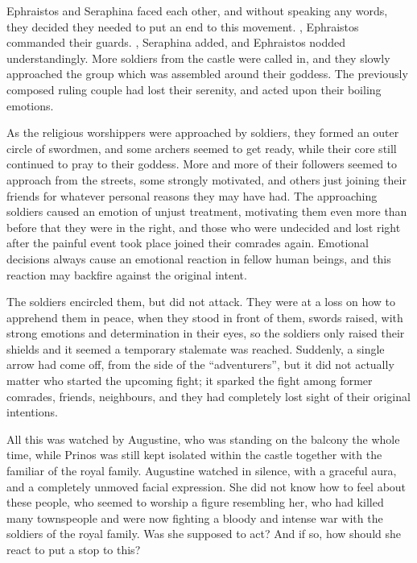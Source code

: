 Ephraistos and Seraphina faced each other, and without speaking any words, they decided they needed to put an end to this movement. , Ephraistos commanded their guards. , Seraphina added, and Ephraistos nodded understandingly. More soldiers from the castle were called in, and they slowly approached the group which was assembled around their goddess. The previously composed ruling couple had lost their serenity, and acted upon their boiling emotions.

As the religious worshippers were approached by soldiers, they formed an outer circle of swordmen, and some archers seemed to get ready, while their core still continued to pray to their goddess. More and more of their followers seemed to approach from the streets, some strongly motivated, and others just joining their friends for whatever personal reasons they may have had. The approaching soldiers caused an emotion of unjust treatment, motivating them even more than before that they were in the right, and those who were undecided and lost right after the painful event took place joined their comrades again. Emotional decisions always cause an emotional reaction in fellow human beings, and this reaction may backfire against the original intent.

The soldiers encircled them, but did not attack. They were at a loss on how to apprehend them in peace, when they stood in front of them, swords raised, with strong emotions and determination in their eyes, so the soldiers only raised their shields and it seemed a temporary stalemate was reached. Suddenly, a single arrow had come off, from the side of the \enquote{adventurers}, but it did not actually matter who started the upcoming fight; it sparked the fight among former comrades, friends, neighbours, and they had completely lost sight of their original intentions.

All this was watched by Augustine, who was standing on the balcony the whole time, while Prinos was still kept isolated within the castle together with the familiar of the royal family. Augustine watched in silence, with a graceful aura, and a completely unmoved facial expression. She did not know how to feel about these people, who seemed to worship a figure resembling her, who had killed many townspeople and were now fighting a bloody and intense war with the soldiers of the royal family. Was she supposed to act? And if so, how should she react to put a stop to this?

